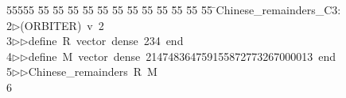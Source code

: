 %
%
\begin{tabbing}
55555 \= 55 \= 55 \= 55 \= 55 \= 55 \= 55 \= 55 \= 55 \= 55 \= 55 \= 55 \= 55 \= \>Chinese\_remainders\_C3:\\[0pt]
2\>$\triangleright$\>(ORBITER)\ v\ 2\ \\[0pt]
3\>$\triangleright$\>$\triangleright$\>define\ R\ vector\ dense\ 234\ end\ \\[0pt]
4\>$\triangleright$\>$\triangleright$\>define\ M\ vector\ dense\ 214748364759155872773267000013\ end\ \\[0pt]
5\>$\triangleright$\>$\triangleright$\>Chinese\_remainders\ R\ M\\[0pt]
6\>\end{tabbing}
